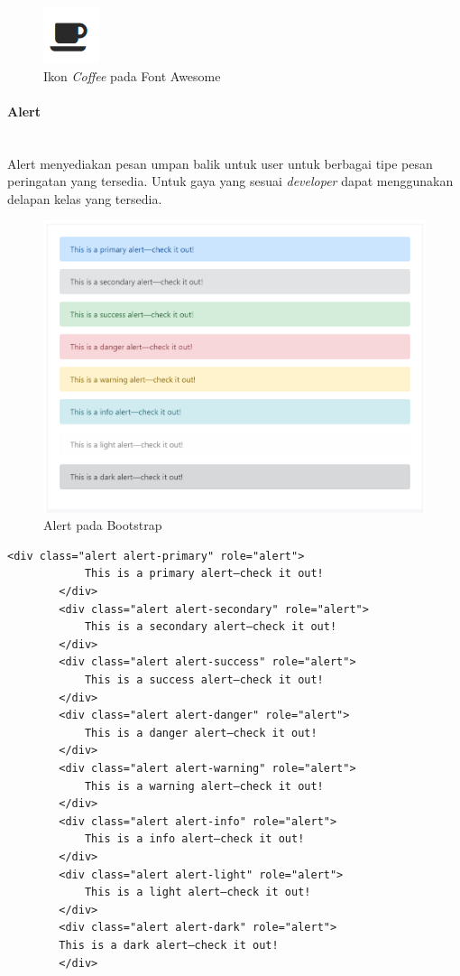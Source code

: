 \documentclass[a4paper,twoside]{article}
\newcommand{\myparagraph}[1]{\paragraph{#1}\mbox{}\\}
\begin{document}
\begin{enumerate}
		\begin{figure} [H]
			\centering  
			\includegraphics[scale=1.0]{fa_coffee.PNG}  
			\caption{Ikon \textit{Coffee} pada Font Awesome} 
		\end{figure}
		\myparagraph{Alert}
		Alert menyediakan pesan umpan balik untuk user untuk berbagai tipe pesan peringatan yang tersedia. Untuk gaya yang sesuai \textit{developer} dapat menggunakan delapan kelas yang tersedia.
		\begin{figure} [H]
			\centering  
			\includegraphics[scale=1.0]{alert_bootstrap.PNG}  
			\caption{Alert pada Bootstrap} 
		\end{figure}
		\begin{lstlisting}[frame=single] 
		<div class="alert alert-primary" role="alert">
			This is a primary alert—check it out!
		</div>
		<div class="alert alert-secondary" role="alert">
			This is a secondary alert—check it out!
		</div>
		<div class="alert alert-success" role="alert">
			This is a success alert—check it out!
		</div>
		<div class="alert alert-danger" role="alert">
			This is a danger alert—check it out!
		</div>
		<div class="alert alert-warning" role="alert">
			This is a warning alert—check it out!
		</div>
		<div class="alert alert-info" role="alert">
			This is a info alert—check it out!
		</div>
		<div class="alert alert-light" role="alert">
			This is a light alert—check it out!
		</div>
		<div class="alert alert-dark" role="alert">
		This is a dark alert—check it out!
		</div>
		\end{lstlisting}
		

\end{enumerate}
\end{document}
